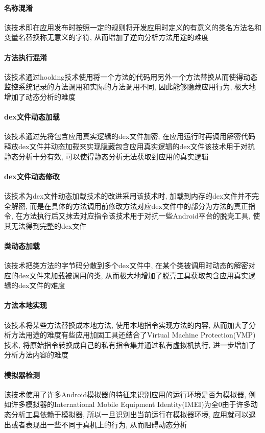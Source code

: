 \paragraph*{名称混淆}
该技术即在应用发布时按照一定的规则将开发应用时定义的有意义的类名\dunhao 方法名\dunhao 和变量名替换称无意义的字符, 从而增加了逆向分析方法用途的难度\juhao

\paragraph*{方法执行混淆}
该技术通过hooking技术使用将一个方法的代码用另外一个方法替换从而使得动态监控系统记录的方法调用和实际的方法调用不同, 因此能够隐藏应用行为, 极大地增加了动态分析的难度\juhao

\paragraph*{dex文件动态加载}
该技术通过先将包含应用真实逻辑的dex文件加密, 在应用运行时再调用解密代码释放dex文件并动态加载来实现隐藏包含应用真实逻辑的dex文件\juhao 该技术用于对抗静态分析十分有效, 可以使得静态分析无法获取到应用的真实逻辑\juhao

\paragraph*{dex文件动态修改}
该技术为dex文件动态加载技术的改进\juhao 采用该技术时, 加载到内存的dex文件并不完全解密, 而是在具体的方法调用前修改方法对应dex文件中的部分为方法的真正指令, 在方法执行后又抹去对应指令\juhao 该技术用于对抗一些Android平台的脱壳工具, 使其无法得到完整的dex文件\juhao

\paragraph*{类动态加载}
该技术把类方法的字节码分散到多个dex文件中, 在某个类被调用时动态的解密对应的dex文件来加载被调用的类, 从而极大地增加了脱壳工具获取包含应用真实逻辑的dex文件的难度\juhao

\paragraph*{方法本地实现}
该技术将某些方法替换成本地方法, 使用本地指令实现方法的内容, 从而加大了分析方法用途的难度\juhao 有些应用加固工具还结合了Virtual Machine Protection(VMP)技术, 将原始指令转换成自己的私有指令集并通过私有虚拟机执行, 进一步增加了分析方法内容的难度\juhao

\paragraph*{模拟器检测}
该技术使用了许多Android模拟器的特征来识别应用的运行环境是否为模拟器, 例如许多模拟器的International Mobile Equipment Identity(IMEI)为全0\juhao 由于许多动态分析工具依赖于模拟器, 所以一旦识别出当前运行在模拟器环境, 应用就可以退出或者表现出一些不同于真机上的行为, 从而阻碍动态分析\juhao

